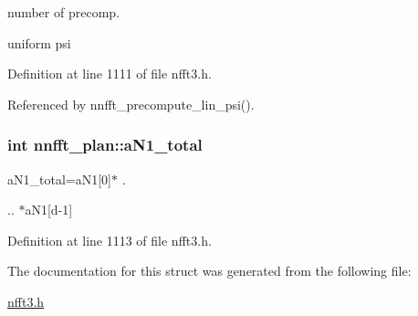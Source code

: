 number of precomp. 

uniform psi 

Definition at line 1111 of file nfft3.h.

Referenced by nnfft\_\-precompute\_\-lin\_\-psi().\hypertarget{structnnfft__plan_cb1a1fa5fdb73d2187e9e9d8e4415921}{
\subsubsection{\setlength{\rightskip}{0pt plus 5cm}int {\bf nnfft\_\-plan::aN1\_\-total}}}
\label{structnnfft__plan_cb1a1fa5fdb73d2187e9e9d8e4415921}


aN1\_\-total=aN1\mbox{[}0\mbox{]}$\ast$ . 

.. $\ast$aN1\mbox{[}d-1\mbox{]} 

Definition at line 1113 of file nfft3.h.

The documentation for this struct was generated from the following file:\begin{CompactItemize}
\item 
\hyperlink{nfft3_8h}{nfft3.h}\end{CompactItemize}
